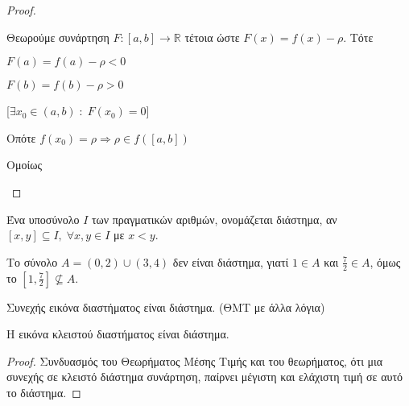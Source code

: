 \documentclass[main.tex]{subfiles}
\begin{document}
\begin{proof}
\item {}
    \begin{description}
        \item [1η Περίπτωση: $(f(a)< \rho < f(b))$]
        \item {}
            Θεωρούμε συνάρτηση $ F \colon [a,b] \to \mathbb{R} $ τέτοια ώστε $ 
            F(x) = f(x) - \rho$. Τότε 

            \begin{minipage}{0.3\textwidth}
                \begin{myitemize}
                \item $F(a) = f(a) - \rho < 0 $ \hfill {}
                \item $F(b) = f(b) - \rho >0 $ \hfill  {}
                \end{myitemize}
            \end{minipage}
            [$ \exists x_{0} \in (a,b) \; : \; F(x_{0}) = 0 $]

            Οπότε 
            $ 
            f(x_{0}) = \rho \Rightarrow \rho \in f([a,b])
            $

        \item [2η Περίπτωση: $(f(b)< \rho < f(a))$]
        \item {}
            Ομοίως
    \end{description}
\end{proof}

\begin{dfn}
    Ένα υποσύνολο $I$ των πραγματικών αριθμών, ονομάζεται διάστημα, αν 
    $ [x,y] \subseteq I, \; \forall x,y \in I $ με $ x<y $.
\end{dfn}

\begin{example}
    Το σύνολο $ A = (0,2) \cup (3,4) $ δεν είναι διάστημα, γιατί $ 1 \in A $ και 
    $ \frac{7}{2} \in A $, όμως το $ \left[1, \frac{7}{2}\right] \not\subseteq A $.
\end{example}

\begin{thm}
    Συνεχής εικόνα διαστήματος είναι διάστημα. (ΘΜΤ με άλλα λόγια)
\end{thm}

\begin{prop}
    Η εικόνα κλειστού διαστήματος είναι διάστημα. 
\end{prop}

\begin{proof}
    Συνδυασμός του Θεωρήματος Μέσης Τιμής και του θεωρήματος, ότι μια συνεχής σε 
    κλειστό διάστημα συνάρτηση, παίρνει μέγιστη και ελάχιστη τιμή σε αυτό το διάστημα.
\end{proof}
\end{document}
